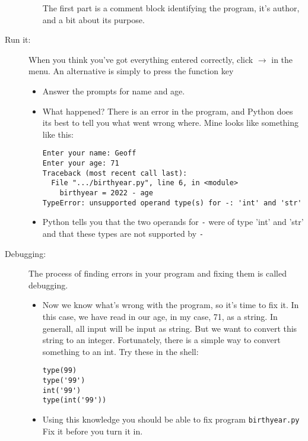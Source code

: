 \documentclass[12pt]{article}
\begin{document}
\begin{description}
\begin{itemize}
The first part is a comment block identifying
the program, it's author, and a bit about its purpose.
\begin{center}
\end{center}
\end{itemize}

\item[Run it:] When you think you've got everything entered
correctly, click $\rightarrow$
in the menu.  An alternative is simply to press the function
key 

\begin{itemize}
\item Answer the prompts for name and age.

\item What happened?  There is an error in the program, and Python
does its best to tell you what went wrong where.  Mine looks like
something like this:
\begin{Verbatim}[frame=single]
Enter your name: Geoff
Enter your age: 71
Traceback (most recent call last):
  File ".../birthyear.py", line 6, in <module>
    birthyear = 2022 - age
TypeError: unsupported operand type(s) for -: 'int' and 'str'
\end{Verbatim}

\item Python tells you that the two operands for \verb|-|
were of type 'int' and 'str' and that these types
are not supported by \verb|-|

\end{itemize}
\item[Debugging:]  The process of finding errors in your
program and fixing them is called debugging.

\begin{itemize}

\item Now we know what's wrong with the program, so it's
time to fix it.  In this case, we have read in our age,
in my case, 71, as a string.  In generall, all input
will be input as string.  But we want to convert this
string to an integer.  Fortunately, there is a simple
way to convert something to an int.  Try these in the shell:
\begin{Verbatim}[frame=single]
type(99)
type('99')
int('99')
type(int('99'))
\end{Verbatim}

\item Using this knowledge you should be able to fix
program \verb|birthyear.py|  Fix it before you turn
it in.

\end{itemize}
\end{description}
\end{document}
